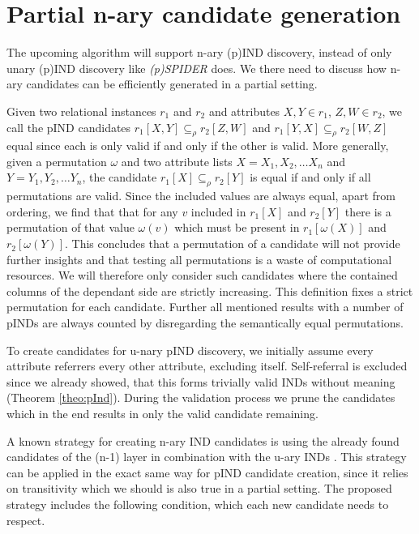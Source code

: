 \section{Partial n-ary candidate generation}
The upcoming algorithm will support n-ary (p)IND discovery, instead of only unary (p)IND discovery like \textit{(p)SPIDER} does. We there need to discuss how n-ary candidates can be efficiently generated in a partial setting. 

\noindent \newline Given two relational instances $r_1$ and $r_2$ and attributes $X, Y \in r_1$, $Z, W \in r_2$, we call the pIND candidates $r_1[X,Y] \subseteq_\rho r_2[Z,W]$ and $r_1[Y,X] \subseteq_\rho r_2[W,Z]$ equal since each is only valid if and only if the other is valid. More generally, given a permutation $\omega$ and two attribute lists $X = X_1, X_2, \dots X_n$ and $Y = Y_1, Y_2, \dots Y_n$, the candidate $r_1[X] \subseteq_\rho r_2[Y]$ is equal if and only if all permutations are valid. Since the included values are always equal, apart from ordering, we find that that for any $v$ included in $r_1[X]$ and $r_2[Y]$ there is a permutation of that value $\omega(v)$ which must be present in $r_1[\omega(X)]$ and $r_2[\omega(Y)]$. This concludes that a permutation of a candidate will not provide further insights and that testing all permutations is a waste of computational resources. We will therefore only consider such candidates where the contained columns of the dependant side are strictly increasing. This definition fixes a strict permutation for each candidate. Further all mentioned results with a number of pINDs are always counted by disregarding the semantically equal permutations.

\noindent \newline To create candidates for u-nary pIND discovery, we initially assume every attribute referrers every other attribute, excluding itself. Self-referral is excluded since we already showed, that this forms trivially valid INDs without meaning (Theorem \ref{theo:pInd}). During the validation process we prune the candidates which in the end results in only the valid candidate remaining.

\noindent \newline A known strategy for creating n-ary IND candidates is using the already found candidates of the (n-1) layer in combination with the u-ary INDs \cite{papenbrock2015divide}. This strategy can be applied in the exact same way for pIND candidate creation, since it relies on transitivity which we should is also true in a partial setting. The proposed strategy includes the following condition, which each new candidate needs to respect.

